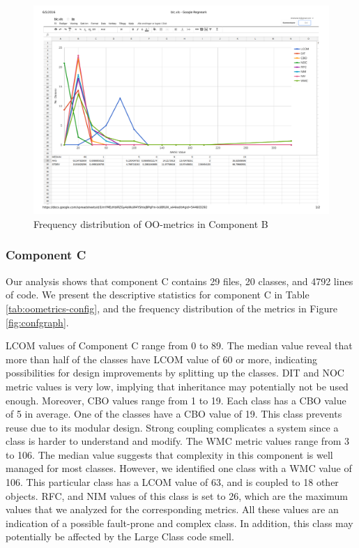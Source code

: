 \begin{landscape}
\setlength\LTleft{-.5in}
	\begin{figure}
	\centering
	\includegraphics[width=\textwidth]{images/pdf/blc.pdf}
	\caption{Frequency distribution of OO-metrics in Component B}
	\label{fig:blcgraph}
	\end{figure}
\end{landscape}



\subsubsection{Component C}
Our analysis shows that component C contains 29 files, 20 classes, and 4792 lines of code. We present the descriptive statistics for component C in Table \ref{tab:oometrics-config}, and the frequency distribution of the metrics in Figure \ref{fig:confgraph}.

LCOM values of Component C range from 0 to 89. The median value reveal that more than half of the classes have LCOM value of 60 or more, indicating possibilities for design improvements by splitting up the classes. DIT and NOC metric values is very low, implying that inheritance may potentially not be used enough. Moreover, CBO values range from 1 to 19. Each class has a CBO value of 5 in average. One of the classes have a CBO value of 19. This class prevents reuse due to its modular design. Strong coupling complicates a system since a class is harder to understand and modify. The WMC metric values range from 3 to 106. The median value suggests that complexity in this component is well managed for most classes. However, we identified one class with a WMC value of 106. This particular class has a LCOM value of 63, and is coupled to 18 other objects. RFC, and NIM values of this class is set to 26, which are the maximum values that we analyzed for the corresponding metrics. All these values are an indication of a possible fault-prone and complex class. In addition, this class may potentially be affected by the Large Class code smell.

